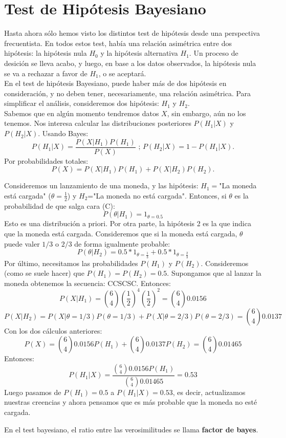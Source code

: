  \section{Test de Hipótesis Bayesiano}
 Hasta ahora sólo hemos visto los distintos test de hipótesis desde una perspectiva frecuentista. En todos estos test, había una relación asimétrica entre dos hipótesis: la hipótesis nula $H_0$ y la hipótesis alternativa $H_1$. Un proceso de desición se lleva acabo, y luego, en base a los datos observados, la hipótesis nula se va a rechazar a favor de $H_1$, o se aceptará. \\
 En el test de hipótesis Bayesiano, puede haber más de dos hipótesis en consideración, y no deben tener, necesariamente, una relación asimétrica.
 Para simplificar el análisis, consideremos dos hipótesis: $H_1$ y $H_2$.\\
 Sabemos que en algún momento tendremos datos $X$, sin embargo, aún no los tenemos. Nos interesa calcular las distribuciones posteriores $P(H_1|X)$ y $P(H_2|X)$. Usando Bayes: 
 $$
 P(H_1|X)=\dfrac{P(X|H_1)P(H_1)}{P(X)} \text{ ; }
 P(H_2|X)=1-P(H_1|X).
 $$
Por probabilidades totales: 
$$
P(X)=P(X|H_1)P(H_1)+P(X|H_2)P(H_2).
$$
\begin{example}
    Consideremos un lanzamiento de una moneda, y las hipótesis: $H_1=$"La moneda está cargada" ($\theta=\frac{1}{2}$) y $H_2$="La moneda no está cargada". Entonces, si $\theta$ es la probabilidad de que salga cara (C):
    $$
    P(\theta|H_1)=1_{\theta=0.5}
    $$
    Esto es una distribución a priori. Por otra parte, la hipótesis 2 es la que indica que la moneda está cargada. Consideremos que si la moneda está cargada, $\theta$ puede valer $1/3$ o $2/3$ de forma igualmente probable: 
     $$
    P(\theta|H_2)= 0.5 *1_{\theta=\frac{1}{3}} + 0.5* 1_{\theta=\frac{2}{3}}
    $$
    Por último, necesitamos las probabilidades $P(H_1)$ y $P(H_2)$. Consideremos (como se suele hacer) que $P(H_1)=P(H_2)=0.5$. Supongamos que al lanzar la moneda obtenemos la secuencia: CCSCSC. Entonces: 
    $$
    P(X|H_1)=  \binom{6}{4} (\dfrac{1}{2})^{4}(\dfrac{1}{2})^{2} =  \binom{6}{4} 0.0156 
    $$
    $$
    P(X|H_2) = P(X|\theta=1/3)P(\theta=1/3)+  P(X|\theta=2/3)P(\theta=2/3) =\binom{6}{4} 0.0137 
    $$
    Con los dos cálculos anteriores: 
    $$
    P(X)= \binom{6}{4} 0.0156 P(H_1) + \binom{6}{4} 0.0137 P(H_2) = \binom{6}{4} 0.01465
    $$
    Entonces: 
    $$
    P(H_1|X)=\dfrac{ \binom{6}{4} 0.0156 P(H_1)}{\binom{6}{4} 0.01465}  = 0.53
    $$
    Luego pasamos de $P(H_1)=0.5$ a $P(H_1|X)=0.53$, es decir, actualizamos nuestras creencias y ahora pensamos que es más probable que la moneda no esté cargada.
\end{example}
 
 En el test bayesiano, el ratio entre las verosimilitudes se llama \textbf{factor de bayes}.
